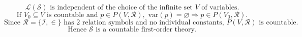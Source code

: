 $$
\mathcal{L}(\mathcal{S}) \text{ is independent of the choice of the infinite set } V \text{ of variables.}
$$
$$
\text{If } V_0 \subseteq V \text{ is countable and } p \in P(V, \mathcal{R}), \text{ var}(p) = \varnothing \Rightarrow p \in P(V_0, \mathcal{R}).
$$
$$
\text{Since } \mathcal{R} = \{\mathcal{I}, \in\} \text{ has 2 relation symbols and no individual constants, } P(V, \mathcal{R}) \text{ is countable.}
$$
$$
\text{Hence } \mathcal{S} \text{ is a countable first-order theory.}
$$
